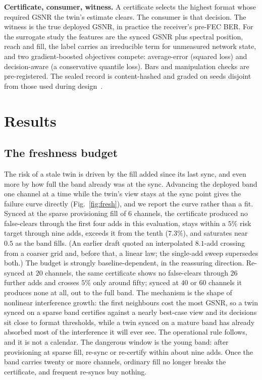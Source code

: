 \documentclass[10pt,twocolumn]{article}
\begin{document}
\textbf{Certificate, consumer, witness.} A certificate selects the highest format
whose required GSNR the twin's estimate clears. The consumer is that decision. The
witness is the true deployed GSNR, in practice the receiver's pre-FEC BER. For the
surrogate study the features are the synced GSNR plus spectral position, reach and
fill, the label carries an irreducible term for unmeasured network state, and two
gradient-boosted objectives compete: average-error (squared loss) and
decision-aware (a conservative quantile loss). Bars and manipulation checks are
pre-registered. The sealed record is content-hashed and graded on seeds disjoint
from those used during design~\cite{otcampaigns}.

\section{Results}
\subsection{The freshness budget}
The risk of a stale twin is driven by the fill added since its last sync, and
even more by how full the band already was at the sync. Advancing
the deployed band one channel at a time while the twin's view stays at the sync
point gives the failure curve directly (Fig.~\ref{fig:fresh}), and we report
the curve rather than a fit. Synced at the sparse provisioning fill of $6$
channels, the certificate produced no false-clears through the first four adds
in this evaluation, stays within a $5\%$ risk target through nine adds, exceeds
it from the tenth ($7.3\%$), and saturates near $0.5$ as the band fills. (An
earlier draft quoted an interpolated $8.1$-add crossing from a coarser grid and,
before that, a linear law; the single-add sweep supersedes both.) The budget is
strongly baseline-dependent, in the reassuring direction. Re-synced at $20$
channels, the same certificate shows no false-clears through $26$ further adds
and crosses $5\%$ only around fifty; synced at $40$ or $60$ channels it produces
none at all, out to the full band. The mechanism is the shape of nonlinear
interference growth: the first neighbours cost the most GSNR, so a twin synced
on a sparse band certifies against a nearly best-case view and its decisions
sit close to format thresholds, while a twin synced on a mature band has
already absorbed most of the interference it will ever see. The operational
rule follows, and it is not a calendar. The dangerous window is the young band:
after provisioning at sparse fill, re-sync or re-certify within about nine
adds. Once the band carries twenty or more channels, ordinary fill no longer
breaks the certificate, and frequent re-syncs buy nothing.
\end{document}
